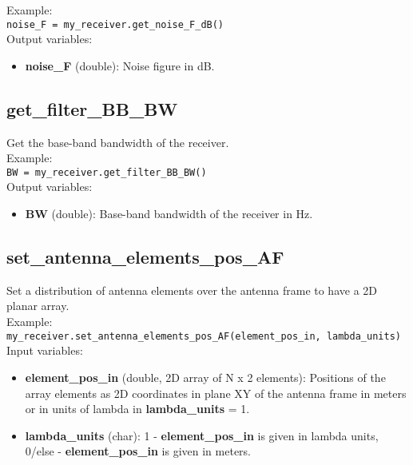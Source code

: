 Example:\\

\texttt{noise\_F = my\_receiver.get\_noise\_F\_dB()}\\

Output variables:
\begin{itemize}
\item {\bf noise\_F} (double): Noise figure in dB.
\end{itemize}


\subsection{get\_filter\_BB\_BW}

Get the base-band bandwidth of the receiver.\\

Example:\\

\texttt{BW = my\_receiver.get\_filter\_BB\_BW()}\\

Output variables:
\begin{itemize}
\item {\bf BW} (double): Base-band bandwidth of the receiver in Hz.
\end{itemize}


\subsection{set\_antenna\_elements\_pos\_AF}

Set a distribution of antenna elements over the antenna frame to have a 2D planar array.\\

Example:\\

\texttt{my\_receiver.set\_antenna\_elements\_pos\_AF(element\_pos\_in, lambda\_units)}\\

Input variables:
\begin{itemize}
\item {\bf element\_pos\_in} (double, 2D array of N x 2 elements): Positions of the array elements as 2D coordinates in plane XY of the antenna frame in meters or in units of lambda in {\bf lambda\_units} = 1.
\item {\bf lambda\_units} (char): 1 - {\bf element\_pos\_in} is given in lambda units, 0/else - {\bf element\_pos\_in} is given in meters.
\end{itemize}


